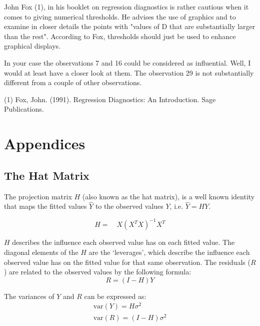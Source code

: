 \documentclass[12pt, a4paper]{article}
\begin{document}
John Fox (1), in his booklet on regression diagnostics is rather cautious when it comes to giving numerical thresholds. He advises the use of graphics and to examine in closer details the points with "values of D that are substantially larger than the rest". According to Fox, thresholds should just be used to enhance graphical displays.

In your case the observations 7 and 16 could be considered as influential. Well, I would at least have a closer look at them. The observation 29 is not substantially different from a couple of other observations.

(1) Fox, John. (1991). Regression Diagnostics: An Introduction. Sage Publications.
\chapter{Appendices} %
\newpage
\section{The Hat Matrix} %

The projection matrix $H$ (also known as the hat matrix), is a
well known identity that maps the fitted values $\hat{Y}$ to the
observed values $Y$, i.e. $\hat{Y} = HY$.

\begin{equation}
H =\quad X(X^{T}X)^{-1}X^{T}
\end{equation}

$H$ describes the influence each observed value has on each fitted
value. The diagonal elements of the $H$ are the `leverages', which
describe the influence each observed value has on the fitted value
for that same observation. The residuals ($R$) are related to the
observed values by the following formula:
\begin{equation}
R = (I-H)Y
\end{equation}

The variances of $Y$ and $R$ can be expressed as:
\begin{eqnarray}
\mbox{var}(Y) = H\sigma^{2} \nonumber\\
\mbox{var}(R) = (I-H)\sigma^{2}
\end{eqnarray}
\end{document}

